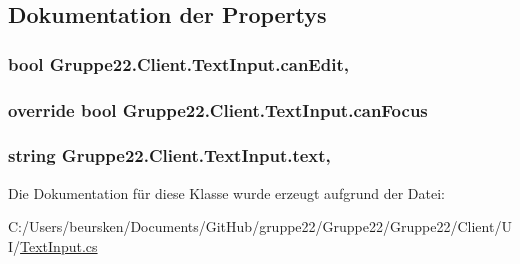 \subsection{Dokumentation der Propertys}
\hypertarget{class_gruppe22_1_1_client_1_1_text_input_ae512171e8f7caead8c28eb9327ccbf40}{
\subsubsection[{can\-Edit}]{\setlength{\rightskip}{0pt plus 5cm}bool Gruppe22.\-Client.\-Text\-Input.\-can\-Edit\hspace{0.3cm}{\ttfamily [get]}, {\ttfamily [set]}}}\label{class_gruppe22_1_1_client_1_1_text_input_ae512171e8f7caead8c28eb9327ccbf40}
\hypertarget{class_gruppe22_1_1_client_1_1_text_input_ac50c924f3a99583da29fe82ff09c876e}{
\subsubsection[{can\-Focus}]{\setlength{\rightskip}{0pt plus 5cm}override bool Gruppe22.\-Client.\-Text\-Input.\-can\-Focus\hspace{0.3cm}{\ttfamily [get]}}}\label{class_gruppe22_1_1_client_1_1_text_input_ac50c924f3a99583da29fe82ff09c876e}
\hypertarget{class_gruppe22_1_1_client_1_1_text_input_a795e9f3cdc6b089dc1cc864907b33f44}{
\subsubsection[{text}]{\setlength{\rightskip}{0pt plus 5cm}string Gruppe22.\-Client.\-Text\-Input.\-text\hspace{0.3cm}{\ttfamily [get]}, {\ttfamily [set]}}}\label{class_gruppe22_1_1_client_1_1_text_input_a795e9f3cdc6b089dc1cc864907b33f44}


Die Dokumentation für diese Klasse wurde erzeugt aufgrund der Datei\-:\begin{DoxyCompactItemize}
\item 
C\-:/\-Users/beursken/\-Documents/\-Git\-Hub/gruppe22/\-Gruppe22/\-Gruppe22/\-Client/\-U\-I/\hyperlink{_text_input_8cs}{Text\-Input.\-cs}\end{DoxyCompactItemize}
